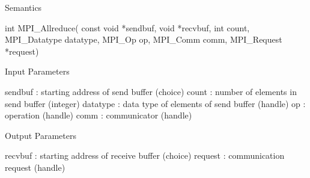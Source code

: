 Semantics

int MPI_Allreduce(
    const void *sendbuf, void *recvbuf,
    int count, MPI_Datatype datatype, MPI_Op op, MPI_Comm comm,
    MPI_Request *request)

Input Parameters

sendbuf : starting address of send buffer (choice)
count : number of elements in send buffer (integer)
datatype : data type of elements of send buffer (handle)
op : operation (handle)
comm : communicator (handle)

Output Parameters

recvbuf : starting address of receive buffer (choice)
request : communication request (handle)
